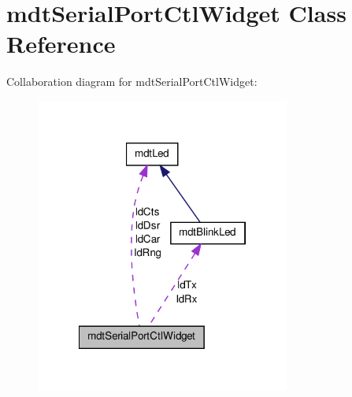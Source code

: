 \hypertarget{classmdt_serial_port_ctl_widget}{
\section{mdtSerialPortCtlWidget Class Reference}
\label{classmdt_serial_port_ctl_widget}
}


Collaboration diagram for mdtSerialPortCtlWidget:
\nopagebreak
\begin{figure}[H]
\begin{center}
\leavevmode
\includegraphics[width=237pt]{classmdt_serial_port_ctl_widget__coll__graph}
\end{center}
\end{figure}
